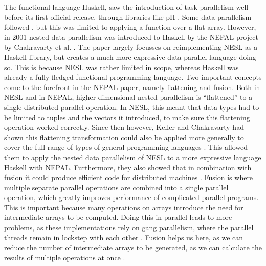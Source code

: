         The functional language Haskell, saw the introduction of task-parallelism well before its first official release, through libraries like pH \cite{maessen1995semantics}.
        Some data-parallelism followed \cite{hill1995data, herrmann1999parallelization, ellmenreich2000application}, but this was limited to applying a function over a flat array.
        However, in 2001 nested data-parallelism was introduced to Haskell by the NEPAL project by Chakravarty et al. \cite{chakravarty2001nepal}.
        The paper largely focusses on reimplementing NESL as a Haskell library, but creates a much more expressive data-parallel language doing so.
        This is because NESL was rather limited in scope, whereas Haskell was already a fully-fledged functional programming language.
        Two important concepts come to the forefront in the NEPAL paper, namely flattening and fusion.
        Both in NESL and in NEPAL, higher-dimensional nested parallelism is ``flattened'' to a single distributed parallel operation.
        In NESL, this meant that data-types had to be limited to tuples and the vectors it introduced, to make sure this flattening operation worked correctly.
        Since then however, Keller and Chakravarty had shown this flattening transformation could also be applied more generally to cover the full range of types of general programming languages \cite{keller1999transformation,keller1998flattening,chakravarty2000more}.
        This allowed them to apply the nested data parallelism of NESL to a more expressive language Haskell with NEPAL.
        Furthermore, they also showed that in combination with fusion it could produce efficient code for distributed machines \cite{chakravarty2001functional}.
        Fusion is where multiple separate parallel operations are combined into a single parallel operation, which greatly improves performance of complicated parallel programs.
        This is important because many operations on arrays introduce the need for intermediate arrays to be computed.
        Doing this in parallel leads to more problems, as these implementations rely on gang parallelism, where the parallel threads remain in lockstep with each other \cite{feitelson1996packing}.
        Fusion helps us here, as we can reduce the number of intermediate arrays to be generated, as we can calculate the results of multiple operations at once \cite{keller1999distributed,chakravarty2007data}.
        
